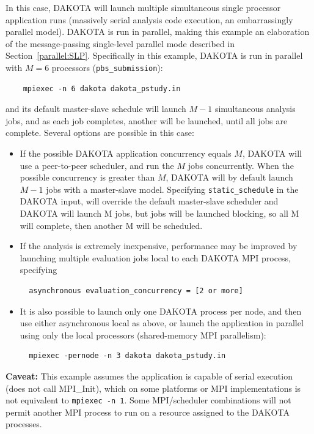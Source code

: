 In this case, DAKOTA will launch multiple simultaneous single
processor application runs (massively serial analysis code execution,
an embarrassingly parallel model).  DAKOTA is run in parallel, making
this example an elaboration of the message-passing single-level
parallel mode described in Section~\ref{parallel:SLP}.  Specifically
in this example, DAKOTA is run in parallel with $M=6$ processors
({\tt pbs\_submission}):
\begin{verbatim}
    mpiexec -n 6 dakota dakota_pstudy.in
\end{verbatim}
and its default master-slave schedule will launch $M-1$ simultaneous
analysis jobs, and as each job completes, another will be launched,
until all jobs are complete.  Several options are possible in this
case:
\begin{itemize}

\item If the possible DAKOTA application concurrency equals $M$,
DAKOTA will use a peer-to-peer scheduler, and run the $M$ jobs
concurrently.  When the possible concurrency is greater than $M$,
DAKOTA will by default launch $M-1$ jobs with a master-slave model.
Specifying {\tt static\_schedule} in the DAKOTA input, will override
the default master-slave scheduler and DAKOTA will launch M jobs, but
jobs will be launched blocking, so all M will complete, then another M
will be scheduled.

\item If the analysis is extremely inexpensive, performance may be
improved by launching multiple evaluation jobs local to each DAKOTA
MPI process, specifying
\begin{verbatim}
  asynchronous evaluation_concurrency = [2 or more]
\end{verbatim}

\item It is also possible to launch only one DAKOTA process per node,
and then use either asynchronous local as above, or launch the
application in parallel using only the local processors (shared-memory
MPI parallelism):

\begin{verbatim}
  mpiexec -pernode -n 3 dakota dakota_pstudy.in
\end{verbatim}

\end{itemize}

{\bf Caveat:} This example assumes the application is capable of
serial execution (does not call MPI\_Init), which on some platforms or
MPI implementations is not equivalent to {\tt mpiexec -n 1}.  Some
MPI/scheduler combinations will not permit another MPI process to run
on a resource assigned to the DAKOTA processes.

